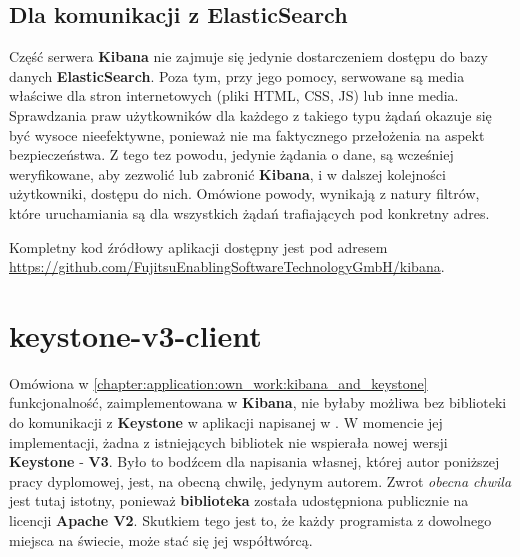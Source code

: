     \subsection{Dla komunikacji z ElasticSearch}
    Część serwera \textbf{Kibana} nie zajmuje się jedynie dostarczeniem dostępu do bazy danych
    \textbf{ElasticSearch}. Poza tym, przy jego pomocy, serwowane są media właściwe dla stron internetowych
    (pliki HTML, CSS, JS) lub inne media. Sprawdzania praw użytkowników dla
    każdego z takiego typu żądań okazuje się być wysoce nieefektywne, ponieważ nie ma faktycznego
    przełożenia na aspekt bezpieczeństwa. Z tego tez powodu, jedynie żądania o dane, są wcześniej 
    weryfikowane, aby zezwolić lub zabronić \textbf{Kibana}, i w dalszej kolejności użytkowniki,
    dostępu do nich. Omówione powody, wynikają z natury filtrów, które uruchamiania są dla 
    wszystkich żądań trafiających pod konkretny adres.

Kompletny kod źródłowy aplikacji dostępny jest pod adresem \url{https://github.com/FujitsuEnablingSoftwareTechnologyGmbH/kibana}.

\section{keystone-v3-client}
Omówiona w \ref{chapter:application:own_work:kibana_and_keystone} funkcjonalność, zaimplementowana w \textbf{Kibana}, nie 
byłaby możliwa bez biblioteki do komunikacji z \textbf{Keystone} w aplikacji napisanej w .
W momencie jej implementacji, żadna z istniejących bibliotek nie wspierała nowej wersji \textbf{Keystone} - \textbf{V3}. 
Było to bodźcem dla napisania własnej, której autor poniższej pracy dyplomowej, jest, na obecną chwilę, jedynym autorem. Zwrot \textit{obecna chwila}
jest tutaj istotny, ponieważ \textbf{biblioteka} została udostępniona publicznie na licencji \textbf{Apache V2}. Skutkiem tego jest to, że
każdy programista z dowolnego miejsca na świecie, może stać się jej współtwórcą. 

